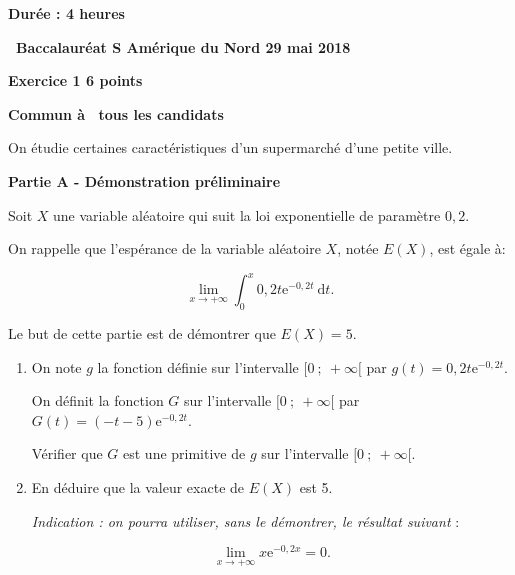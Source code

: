 \documentclass[10pt]{article}
\begin{document}
\setlength\parindent{0mm}
\pagestyle{fancy}
\thispagestyle{empty}
\begin{center}\textbf{Durée : 4 heures}

\vspace{0,5cm}

{\Large \textbf{\decofourleft~Baccalauréat S Amérique du Nord 29 mai 2018~\decofourright}}
\end{center}

\vspace{0,5cm}

\textbf{Exercice 1 \hfill  6 points}

\textbf{Commun à  tous les candidats}

\medskip

On étudie certaines caractéristiques d'un supermarché d'une petite ville.

\bigskip

\textbf{Partie A - Démonstration préliminaire}

\medskip

Soit $X$ une variable aléatoire qui suit la loi exponentielle de paramètre $0,2$.

On rappelle que l'espérance de la variable aléatoire $X$, notée $E(X)$, est égale à:

\[\displaystyle\lim_{x \to + \infty}\displaystyle\int_{0}^{x}  0,2t\text{e}^{-0,2t}\:\text{d}t.\]

Le but de cette partie est de démontrer que $E(X) = 5$.

\medskip

\begin{enumerate}
\item On note $g$ la fonction définie sur l'intervalle $[0~;~+\infty[$ par $g(t) = 0,2t\text{e}^{-0,2t}$.

On définit la fonction $G$ sur l'intervalle $[0~;~+\infty[$ par $G(t) = (- t - 5)\text{e}^{-0,2t}$.

Vérifier que $G$ est une primitive de $g$ sur l'intervalle $[0~;~+\infty[$.
\item  En déduire que la valeur exacte de $E(X)$ est 5.

\emph{Indication : on pourra utiliser, sans le démontrer, le résultat suivant }:

\[\displaystyle\lim_{x \to + \infty} x \text{e}^{- 0,2x} = 0.\]
\end{enumerate}
\end{document}
